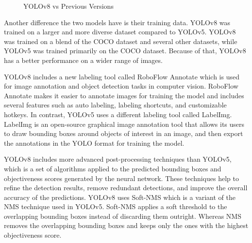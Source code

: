 \documentclass[10pt,twocolumn,letterpaper]{article}
\begin{document}
\begin{figure}[h]
    \centering
    \qquad
    \caption{YOLOv8 vs Previous Versions}%
    \label{fig:Model_Evaluation2}
\end{figure}

Another difference the two models have is their training data. YOLOv8 was trained on a larger and more diverse dataset compared to YOLOv5. YOLOv8 was trained on a blend of the COCO dataset and several other datasets, while YOLOv5 was trained primarily on the COCO dataset. Because of that, YOLOv8 has a better performance on a wider range of images.

YOLOv8 includes a new labeling tool called RoboFlow Annotate which is used for image annotation and object detection tasks in computer vision. RoboFlow Annotate makes it easier to annotate images for training the model and includes several features such as auto labeling, labeling shortcuts, and customizable hotkeys. In contrast, YOLOv5 uses a different labeling tool called LabelImg. LabelImg is an open-source graphical image annotation tool that allows its users to draw bounding boxes around objects of interest in an image, and then export the annotations in the YOLO format for training the model.

YOLOv8 includes more advanced post-processing techniques than YOLOv5, which is a set of algorithms applied to the predicted bounding boxes and objectiveness scores generated by the neural network. These techniques help to refine the detection results, remove redundant detections, and improve the overall accuracy of the predictions. YOLOv8 uses Soft-NMS which is a variant of the NMS technique used in YOLOv5. Soft-NMS applies a soft threshold to the overlapping bounding boxes instead of discarding them outright. Whereas NMS removes the overlapping bounding boxes and keeps only the ones with the highest objectiveness score.
\end{document}
